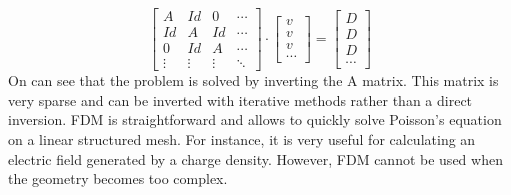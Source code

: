 \begin{refsection}
\begin{equation}
		\begin{bmatrix}
			A      & Id     & 0      & \cdots \\
			Id     & A      & Id     & \cdots \\
			0      & Id     & A      & \cdots \\
			\vdots & \vdots & \vdots & \ddots
		\end{bmatrix}
		\cdot
		\begin{bmatrix}
			v \\
			v \\
			v \\
			\cdots
		\end{bmatrix}
		=
		\begin{bmatrix}
			D \\
			D \\
			D \\
			\cdots
		\end{bmatrix}
	\end{equation}
	On can see that the problem is solved by inverting the A matrix. This matrix is very sparse and can be inverted with iterative methods rather than a direct inversion. FDM is straightforward and allows to quickly solve Poisson’s equation on a linear structured mesh. For instance, it is very useful for calculating an electric field generated by a charge density. However, FDM cannot be used when the geometry becomes too complex.


\end{refsection}
